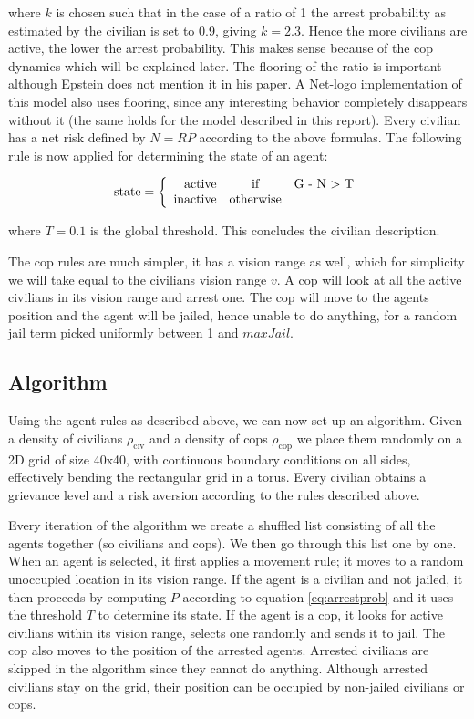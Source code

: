 \documentclass[11pt,a4paper,onecolumn]{article}
\begin{document}
where $k$ is chosen such that in the case of a ratio of 1 the arrest probability as estimated by the civilian is set to 0.9, giving $k = 2.3$. Hence the more civilians are active, the lower the arrest probability. This makes sense because of the cop dynamics which will be explained later. The flooring of the ratio is important although Epstein does not mention it in his paper. A Net-logo implementation of this model also uses flooring, since any interesting behavior completely disappears without it (the same holds for the model described in this report). Every civilian has a net risk defined by $N = RP$ according to the above formulas. The following rule is now applied for determining the state of an agent:

\begin{equation}
\text{state} =
\left\{
    \begin{array}{rcl}
      \text{active} & \mbox{if} & $G - N > T$\\
      \text{inactive} & \mbox{otherwise} &
    \end{array}
\right.
\end{equation}

where $T = 0.1$ is the global threshold. This concludes the civilian description.

The cop rules are much simpler, it has a vision range as well, which for simplicity we will take equal to the civilians vision range $v$. A cop will look at all the active civilians in its vision range and arrest one. The cop will move to the agents position and the agent will be jailed, hence unable to do anything, for a random jail term picked uniformly between 1 and $maxJail$.

\subsection{Algorithm}
Using the agent rules as described above, we can now set up an algorithm. Given a density of civilians $\rho_{\text{civ}}$ and a density of cops $\rho_{\text{cop}}$ we place them randomly on a 2D grid of size 40x40, with continuous boundary conditions on all sides, effectively bending the rectangular grid in a torus. Every civilian obtains a grievance level and a risk aversion according to the rules described above.

Every iteration of the algorithm we create a shuffled list consisting of all the agents together (so civilians and cops). We then go through this list one by one. When an agent is selected, it first applies a movement rule; it moves to a random unoccupied location in its vision range. If the agent is a civilian and not jailed, it then proceeds by computing $P$ according to equation \ref{eq:arrestprob} and it uses the threshold $T$ to determine its state. If the agent is a cop, it looks for active civilians within its vision range, selects one randomly and sends it to jail. The cop also moves to the position of the arrested agents. Arrested civilians are skipped in the algorithm since they cannot do anything. Although arrested civilians stay on the grid, their position can be occupied by non-jailed civilians or cops.
\end{document}
